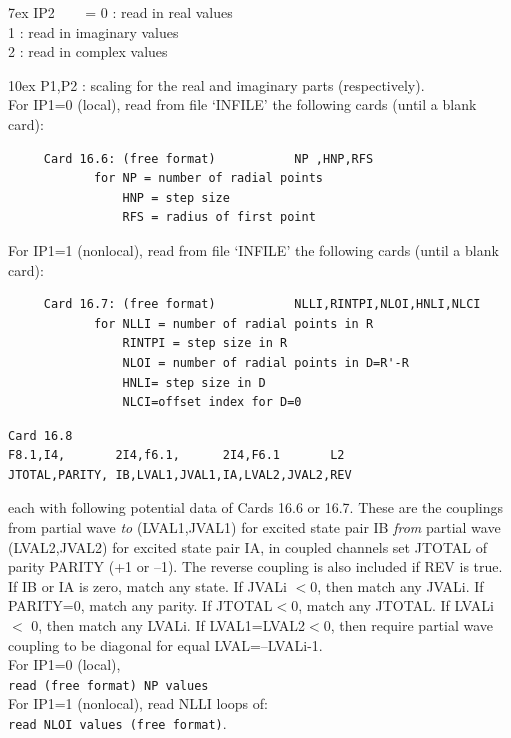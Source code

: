 \documentclass[11pt]{article}
\begin{document}
\hangindent 7ex  IP2
~~~  = 0 : read in real values   
\\   1 : read in imaginary values   
\\   2 : read in complex values       

\hangindent 10ex
 P1,P2 : scaling for the real and imaginary parts (respectively).\\

For IP1=0 (local), read from file `INFILE' the following cards
   (until a blank card):
\begin{verbatim}
     Card 16.6: (free format)           NP ,HNP,RFS
            for NP = number of radial points
                HNP = step size
                RFS = radius of first point
\end{verbatim}
For IP1=1 (nonlocal), read from file `INFILE' the following cards
   (until a blank card):
\begin{verbatim}
     Card 16.7: (free format)           NLLI,RINTPI,NLOI,HNLI,NLCI
            for NLLI = number of radial points in R
                RINTPI = step size in R
                NLOI = number of radial points in D=R'-R
                HNLI= step size in D
                NLCI=offset index for D=0
\end{verbatim}

\begin{verbatim}
Card 16.8
F8.1,I4,       2I4,f6.1,      2I4,F6.1       L2
JTOTAL,PARITY, IB,LVAL1,JVAL1,IA,LVAL2,JVAL2,REV
\end{verbatim}
each with following potential data of Cards 16.6 or 16.7.
These are the couplings from partial wave {\em to}  (LVAL1,JVAL1) for excited state pair IB
{\em from} partial wave (LVAL2,JVAL2) for excited state pair IA, in coupled channels set JTOTAL of parity PARITY (+1 or --1). 
The reverse coupling is also included if REV is true.\\

If IB or IA is zero, match any state. If JVALi $< $0, then match any JVALi. If PARITY=0, match any parity.
If JTOTAL$<$0, match any JTOTAL.  If LVALi $<$ 0, then match any LVALi.
If LVAL1=LVAL2$<$0, then require partial wave coupling to be diagonal for equal LVAL=--LVALi-1.\\


For IP1=0 (local), \\
  \hspace*{8mm} {\tt read (free format) NP values}\\

For IP1=1 (nonlocal), read NLLI loops of:\\
      \hspace*{8mm} {\tt read NLOI values (free format)}.\\
\end{document}
